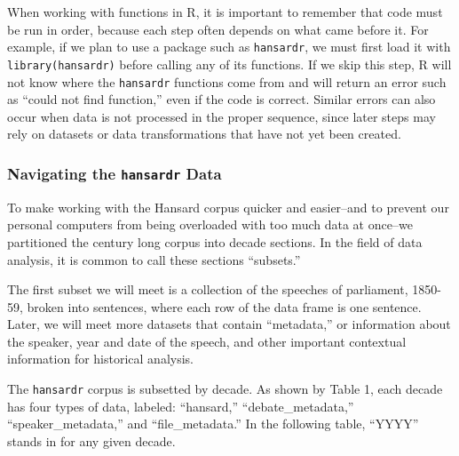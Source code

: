 \documentclass[
]{article}
\begin{document}
When working with functions in R, it is important to remember that code
must be run in order, because each step often depends on what came
before it. For example, if we plan to use a package such as
\texttt{hansardr}, we must first load it with \texttt{library(hansardr)}
before calling any of its functions. If we skip this step, R will not
know where the \texttt{hansardr} functions come from and will return an
error such as ``could not find function,'' even if the code is correct.
Similar errors can also occur when data is not processed in the proper
sequence, since later steps may rely on datasets or data transformations
that have not yet been created.

\subsubsection{\texorpdfstring{Navigating the \texttt{hansardr}
Data}{Navigating the hansardr Data}}\label{navigating-the-hansardr-data}

To make working with the Hansard corpus quicker and easier--and to
prevent our personal computers from being overloaded with too much data
at once--we partitioned the century long corpus into decade sections. In
the field of data analysis, it is common to call these sections
``subsets.''

The first subset we will meet is a collection of the speeches of
parliament, 1850-59, broken into sentences, where each row of the data
frame is one sentence. Later, we will meet more datasets that contain
``metadata,'' or information about the speaker, year and date of the
speech, and other important contextual information for historical
analysis.

The \texttt{hansardr} corpus is subsetted by decade. As shown by Table
1, each decade has four types of data, labeled: ``hansard,''
``debate\_metadata,'' ``speaker\_metadata,'' and ``file\_metadata.'' In
the following table, ``YYYY'' stands in for any given decade.
\end{document}
